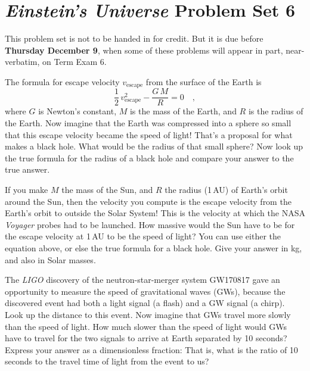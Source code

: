 \documentclass[12pt, letterpaper]{article}
\newcommand{\escape}{\mathrm{escape}}
\begin{document}
\section*{\textsl{Einstein's Universe} Problem Set 6}

This problem set is not to be handed in for credit. But it is due
before \textbf{Thursday December 9}, when some of these problems
will appear in part, near-verbatim, on Term Exam 6.

\begin{problem}
The formula for escape velocity $v_{\escape}$ from the surface of the Earth
is
\begin{equation}
\frac{1}{2}\,v_{\escape}^2 - \frac{G\,M}{R} = 0
\quad,
\end{equation}
where $G$ is Newton's constant, $M$ is the mass of the Earth, and $R$
is the radius of the Earth.
Now imagine that the Earth was compressed into a sphere so small that
this escape velocity became the speed of light! That's a proposal for what
makes a black hole. What would be the radius of that small sphere?
Now look up the true formula for the radius of a black hole and compare
your answer to the true answer.

If you make $M$ the mass of the Sun, and $R$ the radius (1\,AU) of
Earth's orbit around the Sun, then the velocity you compute is the
escape velocity from the Earth's orbit to outside the Solar System!
This is the velocity at which the {\small NASA} \textsl{Voyager} probes had to
be launched.
How massive would the Sun have to be for the escape velocity at 1\,AU
to be the speed of light? You can use either the equation above, or
else the true formula for a black hole.
Give your answer in kg, and also in Solar masses.
\end{problem}

\begin{problem}
The \textsl{\small LIGO} discovery of the neutron-star-merger system
{\small GW170817} gave an opportunity to measure the speed of
gravitational waves (GWs), because the discovered event had both a
light signal (a flash) and a GW signal (a chirp).
Look up the distance to this event.
Now imagine that GWs travel more slowly than the speed of light.
How much slower than the speed of light would GWs have to travel for
the two signals to arrive at Earth separated by 10 seconds?
Express your answer as a dimensionless fraction:
That is, what is the ratio of 10 seconds to the travel time of light from
the event to us?
\end{problem}
\end{document}
